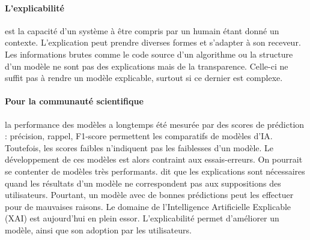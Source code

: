 \paragraph{L'explicabilité} est la capacité d'un système à être compris par un humain étant donné un contexte. L'explication peut prendre diverses formes et s'adapter à son receveur. %
Les informations brutes comme le code source d'un algorithme ou la structure d'un modèle ne sont pas des explications mais de la transparence. Celle-ci ne suffit pas à rendre un modèle explicable, surtout si ce dernier est complexe.

\paragraph{Pour la communauté scientifique} la performance des modèles a longtemps été mesurée par des scores de prédiction : précision, rappel, F1-score permettent les comparatifs de modèles d'IA.
Toutefois, les scores faibles n'indiquent pas les faiblesses d'un modèle. Le développement de ces modèles est alors contraint aux essais-erreurs.
On pourrait se contenter de modèles très performants. %
\cite{Dam2018} dit que les explications sont nécessaires quand les résultats d'un modèle ne correspondent pas aux suppositions des utilisateurs.
Pourtant, un modèle avec de bonnes prédictions peut les effectuer pour de mauvaises raisons. %
Le domaine de l'Intelligence Artificielle Explicable (XAI) est aujourd'hui en plein essor. L'explicabilité permet d'améliorer un modèle, ainsi que son adoption par les utilisateurs.

